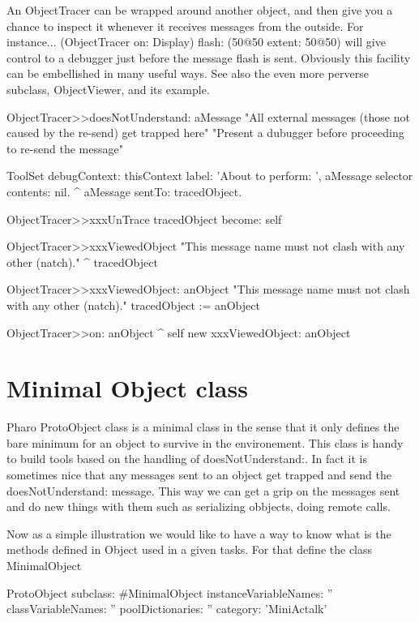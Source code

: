 \documentclass[a4paper,10pt,twoside]{book}
\begin{document}
An ObjectTracer can be wrapped around another object, and then give you a chance to inspect it whenever it receives messages from the outside.  For instance...
	(ObjectTracer on: Display) flash: (50@50 extent: 50@50)
will give control to a debugger just before the message flash is sent.
Obviously this facility can be embellished in many useful ways.
See also the even more perverse subclass, ObjectViewer, and its example.

\begin{code}{}
ObjectTracer>>doesNotUnderstand: aMessage 
	"All external messages (those not caused by the re-send) get trapped here"
	"Present a dubugger before proceeding to re-send the message"

	ToolSet debugContext: thisContext
				label: 'About to perform: ', aMessage selector
				contents: nil.
	^ aMessage sentTo: tracedObject.

ObjectTracer>>xxxUnTrace
	tracedObject become: self

ObjectTracer>>xxxViewedObject
	"This message name must not clash with any other (natch)."
	^ tracedObject

ObjectTracer>>xxxViewedObject: anObject
	"This message name must not clash with any other (natch)."
	tracedObject := anObject

ObjectTracer>>on: anObject
	^ self new xxxViewedObject: anObject
\end{code}






\section{Minimal Object class}

Pharo ProtoObject class is a minimal class in the sense that it only defines the bare minimum for an object to survive in the environement. This class is handy to build tools based on the handling of doesNotUnderstand:.
In fact it is sometimes nice that any messages sent to an object get trapped and send the doesNotUnderstand: message.
This way we can get a grip on the messages sent and do new things with them such as serializing obbjects, doing remote calls.

Now as a simple illustration we would like to have a way to know what is the methods defined in Object used in a given tasks. 
For that define the class MinimalObject

\begin{classdef}{}
ProtoObject subclass: #MinimalObject
	instanceVariableNames: ''
	classVariableNames: ''
	poolDictionaries: ''
	category: 'MiniActalk'
\end{classdef}
\end{document}
